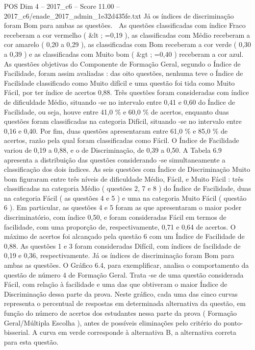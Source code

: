 \begin{textsample}{POS Dim 4 – 2017\_c6 – Score 11.00 – 2017\_c6/enade\_2017\_admin\_1e32d435fe.txt}
Já os índices de discriminação foram Bom para ambas as questões.  As questões classificadas com índice Fraco receberam a cor vermelho ( \&lt ; =0,19 ), as classificadas com Médio receberam a cor amarelo ( 0,20 a 0,29 ), as classificadas com Bom receberam a cor verde ( 0,30 a 0,39 ) e as classificadas com Muito bom ( \&gt ; =0,40 ) receberam a cor azul.
As questões objetivas do Componente de Formação Geral, segundo o Índice de Facilidade, foram assim avaliadas : das oito questões, nenhuma teve o Índice de Facilidade classificado como Muito difícil e uma questão foi tida como Muito Fácil, por ter índice de acertos 0,88.
Três questões foram consideradas com índice de dificuldade Médio, situando -se no intervalo entre 0,41 e 0,60 do Índice de Facilidade, ou seja, houve entre 41,0 \% e 60,0 \% de acertos, enquanto duas questões foram classificadas na categoria Difícil, situando -se no intervalo entre 0,16 e 0,40.
Por fim, duas questões apresentaram entre 61,0 \% e 85,0 \% de acertos, razão pela qual foram classificadas como Fácil.
O Índice de Facilidade variou de 0,19 a 0,88, e o de Discriminação, de 0,39 a 0,50.
A Tabela 6.9 apresenta a distribuição das questões considerando -se simultaneamente a classificação dos dois índices.
As seis questões com Índice de Discriminação Muito bom figuraram entre três níveis de dificuldade Médio, Fácil, e Muito Fácil : três classificadas na categoria Médio ( questões 2, 7 e 8 ) do Índice de Facilidade, duas na categoria Fácil ( as questões 4 e 5 ) e uma na categoria Muito Fácil ( questão 6 ).
Em particular, as questões 4 e 5 foram as que apresentaram o maior poder discriminatório, com índice 0,50, e foram consideradas Fácil em termos de facilidade, com uma proporção de, respectivamente, 0,71 e 0,64 de acertos.
O máximo de acertos foi alcançado pela questão 6 com um Índice de Facilidade de 0,88.
As questões 1 e 3 foram consideradas Difícil, com índices de facilidade de 0,19 e 0,36, respectivamente.
Já os índices de discriminação foram Bom para ambas as questões.
O Gráfico 6.4, para exemplificar, analisa o comportamento da questão de número 4 de Formação Geral.
Trata -se de uma questão considerada Fácil, com relação à facilidade e uma das que obtiveram o maior Índice de Discriminação dessa parte da prova.
Neste gráfico, cada uma das cinco curvas representa o percentual de respostas em determinada alternativa da questão, em função do número de acertos dos estudantes nessa parte da prova ( Formação Geral/Múltipla Escolha ), antes de possíveis eliminações pelo critério do ponto-bisserial.
A curva em verde corresponde à alternativa B, a alternativa correta para esta questão.

\end{textsample}
